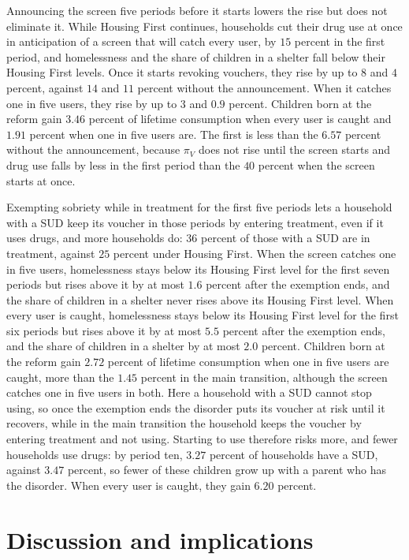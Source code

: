 \documentclass[10pt]{article}
\begin{document}
Announcing the screen five periods before it starts lowers the rise but does not eliminate it. While Housing First continues, households cut their drug use at once in anticipation of a screen that will catch every user, by $15$ percent in the first period, and homelessness and the share of children in a shelter fall below their Housing First levels. Once it starts revoking vouchers, they rise by up to $8$ and $4$ percent, against $14$ and $11$ percent without the announcement. When it catches one in five users, they rise by up to $3$ and $0.9$ percent. Children born at the reform gain $3.46$ percent of lifetime consumption when every user is caught and $1.91$ percent when one in five users are. The first is less than the $6.57$ percent without the announcement, because $\pi_V$ does not rise until the screen starts and drug use falls by less in the first period than the $40$ percent when the screen starts at once.

Exempting sobriety while in treatment for the first five periods lets a household with a SUD keep its voucher in those periods by entering treatment, even if it uses drugs, and more households do: $36$ percent of those with a SUD are in treatment, against $25$ percent under Housing First. When the screen catches one in five users, homelessness stays below its Housing First level for the first seven periods but rises above it by at most $1.6$ percent after the exemption ends, and the share of children in a shelter never rises above its Housing First level. When every user is caught, homelessness stays below its Housing First level for the first six periods but rises above it by at most $5.5$ percent after the exemption ends, and the share of children in a shelter by at most $2.0$ percent. Children born at the reform gain $2.72$ percent of lifetime consumption when one in five users are caught, more than the $1.45$ percent in the main transition, although the screen catches one in five users in both. Here a household with a SUD cannot stop using, so once the exemption ends the disorder puts its voucher at risk until it recovers, while in the main transition the household keeps the voucher by entering treatment and not using. Starting to use therefore risks more, and fewer households use drugs: by period ten, $3.27$ percent of households have a SUD, against $3.47$ percent, so fewer of these children grow up with a parent who has the disorder. When every user is caught, they gain $6.20$ percent.

\section{Discussion and implications}\label{sec:discussion}
\end{document}
